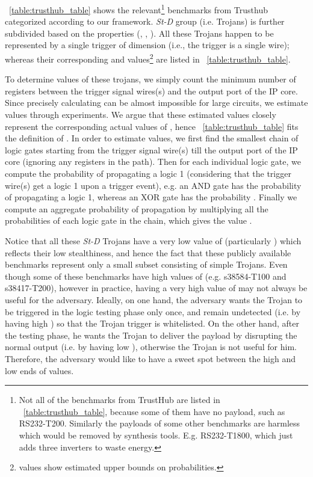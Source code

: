 \documentclass[10pt,journal,compsoc]{IEEEtran}
\begin{document}
\tablename~\ref{table:trusthub_table} shows the relevant\footnote{Not all of the benchmarks from TrustHub are listed in \tablename~\ref{table:trusthub_table}, because some of them have no payload, such as RS232-T200. Similarly the payloads of some other benchmarks are harmless which would be removed by synthesis tools. E.g. RS232-T1800, which just adds three inverters to waste energy.} benchmarks from Trusthub categorized according to our framework.
\textit{St-D} group (i.e.  Trojans) is further subdivided based on the properties (, , ).
All these Trojans happen to be represented by a single trigger of dimension  (i.e., the trigger is a single wire); whereas their corresponding  and  values\footnote{ values show estimated upper bounds on probabilities.} are listed in \tablename~\ref{table:trusthub_table}.

To determine  values of these trojans, we simply count the minimum number of registers between the trigger signal wires(s) and the output port of the IP core.
Since precisely calculating  can be almost impossible for large circuits, we estimate  values through experiments.
We argue that these estimated values closely represent the corresponding actual values of , hence \tablename~\ref{table:trusthub_table} fits the definition of .
In order to estimate  values, we first find the smallest chain of logic gates starting from the trigger signal wire(s) till the output port of the IP core (ignoring any registers in the path).
Then for each individual logic gate, we compute the probability of propagating a logic 1 (considering that the trigger wire(s) get a logic 1 upon a trigger event), e.g. an AND gate has the probability  of propagating a logic 1, whereas an XOR gate has the probability .
Finally we compute an aggregate probability of propagation by multiplying all the probabilities of each logic gate in the chain, which gives the value .


Notice that all these \textit{St-D} Trojans have a very low value of  (particularly ) which reflects their low stealthiness, and hence the fact that these publicly available benchmarks represent only a small subset consisting of simple Trojans.
Even though some of these benchmarks have high values of  (e.g. s38584-T100 and s38417-T200), however in practice, having a very high value of  may not always be useful for the adversary.
Ideally, on one hand, the adversary wants the Trojan to be triggered in the logic testing phase only once, and remain undetected (i.e. by having high ) so that the Trojan trigger is whitelisted.
On the other hand, after the testing phase, he wants the Trojan to deliver the payload by disrupting the normal output (i.e. by having low ), otherwise the Trojan is not useful for him.
Therefore, the adversary would like to have a sweet spot between the high and low ends of  values.
\end{document}
